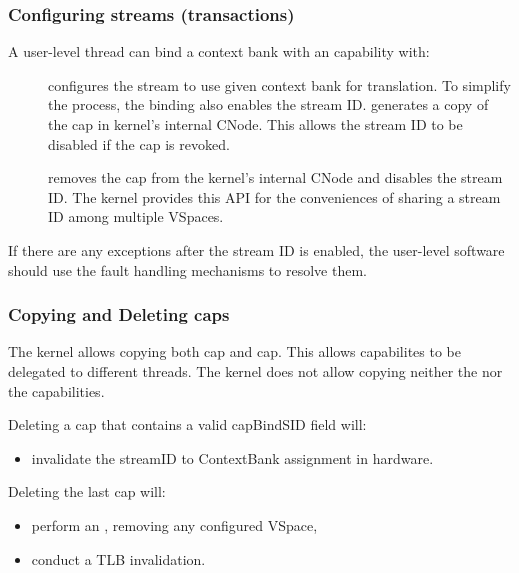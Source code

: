 \subsubsection{Configuring streams (transactions)}
\label{sec:smmuv2-configuring-streams-transactions}

A user-level thread can bind a context bank with an 
capability with:
\begin{description}
    \item[] configures the stream
        to use given context bank for translation. To simplify the process, the
        binding also enables the stream ID.  
        generates a copy of the  cap in kernel's internal
        CNode. This allows the stream ID to be disabled if the
         cap is revoked.
    \item[] removes the
         cap from the kernel's internal CNode and disables
        the stream ID. The kernel provides this API for the conveniences of
        sharing a stream ID among multiple VSpaces.
\end{description}

If there are any exceptions after the stream ID is enabled, the user-level
software should use the fault handling mechanisms to resolve them.



\subsubsection{Copying and Deleting caps}
\label{sec:smmuv2-copying-and-deleting-caps}
The kernel allows copying both  cap and  cap.
This allows capabilites to be delegated to different threads.
The kernel does not allow copying neither the  nor
the  capabilities.

Deleting a  cap that contains a valid capBindSID field will:
\begin{itemize}
    \item invalidate the streamID to ContextBank assignment in hardware.
\end{itemize}

Deleting the last  cap will:
\begin{itemize}
    \item perform an ,
    removing any configured VSpace,
    \item conduct a TLB invalidation.
\end{itemize}

